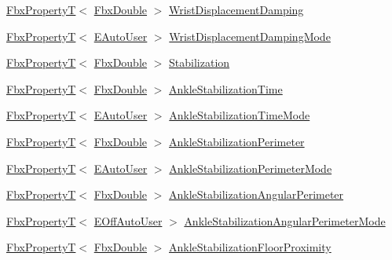 \begin{DoxyCompactItemize}
\item 
\hyperlink{class_fbx_property_t}{Fbx\+PropertyT}$<$ \hyperlink{fbxtypes_8h_a171e72a1c46fc15c1a6c9c31948c1c5b}{Fbx\+Double} $>$ \hyperlink{class_fbx_character_a5bfe39a4704ca85d5bb599dfbd8aac26}{Wrist\+Displacement\+Damping}
\item 
\hyperlink{class_fbx_property_t}{Fbx\+PropertyT}$<$ \hyperlink{class_fbx_character_a5b03462709a82a15d89ee4563a4c49df}{E\+Auto\+User} $>$ \hyperlink{class_fbx_character_a9b406a1fb80fcc2f48239a80c14ee472}{Wrist\+Displacement\+Damping\+Mode}
\item 
\hyperlink{class_fbx_property_t}{Fbx\+PropertyT}$<$ \hyperlink{fbxtypes_8h_a171e72a1c46fc15c1a6c9c31948c1c5b}{Fbx\+Double} $>$ \hyperlink{class_fbx_character_a52d730a256495edf5b99b323f40cfcfe}{Stabilization}
\item 
\hyperlink{class_fbx_property_t}{Fbx\+PropertyT}$<$ \hyperlink{fbxtypes_8h_a171e72a1c46fc15c1a6c9c31948c1c5b}{Fbx\+Double} $>$ \hyperlink{class_fbx_character_a68bd7769c89201b7f652189a581585bc}{Ankle\+Stabilization\+Time}
\item 
\hyperlink{class_fbx_property_t}{Fbx\+PropertyT}$<$ \hyperlink{class_fbx_character_a5b03462709a82a15d89ee4563a4c49df}{E\+Auto\+User} $>$ \hyperlink{class_fbx_character_a3153af9c5fe1f2cd48022ccc4cfed804}{Ankle\+Stabilization\+Time\+Mode}
\item 
\hyperlink{class_fbx_property_t}{Fbx\+PropertyT}$<$ \hyperlink{fbxtypes_8h_a171e72a1c46fc15c1a6c9c31948c1c5b}{Fbx\+Double} $>$ \hyperlink{class_fbx_character_af18107f4ccd81a9d9f85f61814e77a0c}{Ankle\+Stabilization\+Perimeter}
\item 
\hyperlink{class_fbx_property_t}{Fbx\+PropertyT}$<$ \hyperlink{class_fbx_character_a5b03462709a82a15d89ee4563a4c49df}{E\+Auto\+User} $>$ \hyperlink{class_fbx_character_a311b4f7bef7007a17612aae9c9d1542d}{Ankle\+Stabilization\+Perimeter\+Mode}
\item 
\hyperlink{class_fbx_property_t}{Fbx\+PropertyT}$<$ \hyperlink{fbxtypes_8h_a171e72a1c46fc15c1a6c9c31948c1c5b}{Fbx\+Double} $>$ \hyperlink{class_fbx_character_a840b9b40bcdb89d082b95648dd5bf01e}{Ankle\+Stabilization\+Angular\+Perimeter}
\item 
\hyperlink{class_fbx_property_t}{Fbx\+PropertyT}$<$ \hyperlink{class_fbx_character_ab698a180e6f900ba8317257749c2ecce}{E\+Off\+Auto\+User} $>$ \hyperlink{class_fbx_character_a4e2e43a909f4393c6fbc8a8e98caa473}{Ankle\+Stabilization\+Angular\+Perimeter\+Mode}
\item 
\hyperlink{class_fbx_property_t}{Fbx\+PropertyT}$<$ \hyperlink{fbxtypes_8h_a171e72a1c46fc15c1a6c9c31948c1c5b}{Fbx\+Double} $>$ \hyperlink{class_fbx_character_aab4dcde4d515e2f489d7bbddbfa50460}{Ankle\+Stabilization\+Floor\+Proximity}

\end{DoxyCompactItemize}
